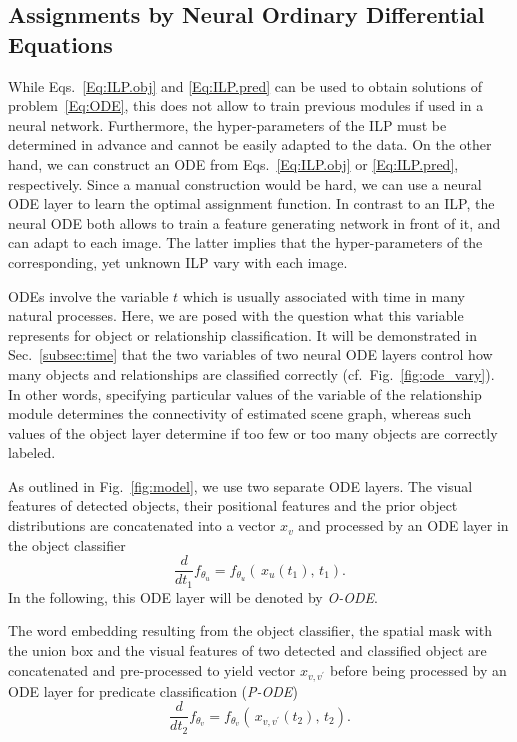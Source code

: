 \documentclass[runningheads]{llncs}
\begin{document}
\subsection{Assignments by Neural Ordinary Differential Equations}
\label{Sec:Assignments}

While Eqs.~\eqref{Eq:ILP.obj} and \eqref{Eq:ILP.pred} can be used to obtain solutions of problem~\eqref{Eq:ODE}, this does not allow to train previous modules if used in a neural network. Furthermore, the hyper-parameters of the ILP must be determined in advance and cannot be easily adapted to the data. On the other hand, we can construct an ODE from Eqs.~\eqref{Eq:ILP.obj} or \eqref{Eq:ILP.pred}, respectively. Since a manual construction would be hard, we can use a neural ODE layer to learn the optimal assignment function. In contrast to an ILP, the neural ODE both allows to train a feature generating network in front of it, and can adapt to each image. The latter implies that the hyper-parameters of the corresponding, yet unknown ILP vary with each image.


ODEs involve the variable $t$ which is usually associated with time in many natural processes. Here, we are posed with the question what this variable represents for object or relationship classification. It will be demonstrated in Sec.~\ref{subsec:time} that the two variables of two neural ODE layers control how many objects and relationships are classified correctly (cf.~Fig.~\ref{fig:ode_vary}). In other words, specifying particular values of the variable of the relationship module  determines the connectivity of estimated scene graph, whereas such values of the object layer determine if too few or too many objects are correctly labeled.

As outlined in Fig.~\ref{fig:model}, we use two separate ODE layers. The visual features of detected objects, their positional features and the prior object distributions are concatenated into a vector $x_v$ and processed by an ODE layer in the object classifier
\begin{equation}
    \frac{d}{dt_1} f_{\theta_u} = f_{\theta_u} \left(  \, x_{u}(t_1), \, t_1 \right).
    \label{Eq:ODE.obj}
\end{equation}
In the following, this ODE layer will be denoted by \emph{O-ODE}.

The word embedding resulting from the object classifier, the spatial mask with the union box and the visual features of two detected and classified object are concatenated and pre-processed to yield vector $x_{v,v^\prime}$ before being processed by an ODE layer for predicate classification (\emph{P-ODE})
\begin{equation}
    \frac{d}{dt_2} f_{\theta_v} = f_{\theta_v} \left(  \, x_{v,v^\prime}(t_2), \, t_2 \right).
    \label{Eq:ODE.pred}
\end{equation}
\end{document}
